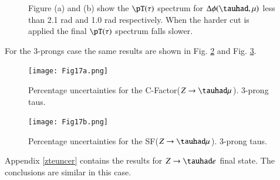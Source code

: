 \begin{figure}[htbp]
	\centering
	\caption{Figure (a) and (b) show the  $\pT(\tau)$ spectrum for  $\Delta\phi(\tauhad ,\mu)$ less than 2.1 rad and 1.0 rad respectively. When the harder cut is applied the final $\pT(\tau)$ spectrum falls slower.}
	\label{Fig18}
\end{figure}

For the 3-prongs case the same results are shown in Fig. \ref{Fig17a} and Fig. \ref{Fig17b}.

\begin{figure}[htbp]
	\centering
	\texttt{[image: Fig17a.png]}
	\caption{Percentage uncertainties for the C-Factor($Z\to\tauhad\mu$). 3-prong taus.}
	\label{Fig17a}
\end{figure}
\begin{figure}[htbp]
	\centering
	\texttt{[image: Fig17b.png]}
	\caption{Percentage uncertainties for the SF($Z\to\tauhad\mu$). 3-prong taus.}
	\label{Fig17b}
\end{figure}

Appendix \ref{zteuncer} contains the results for $Z\to\tauhad e$ final state. The conclusions are similar in this case.

